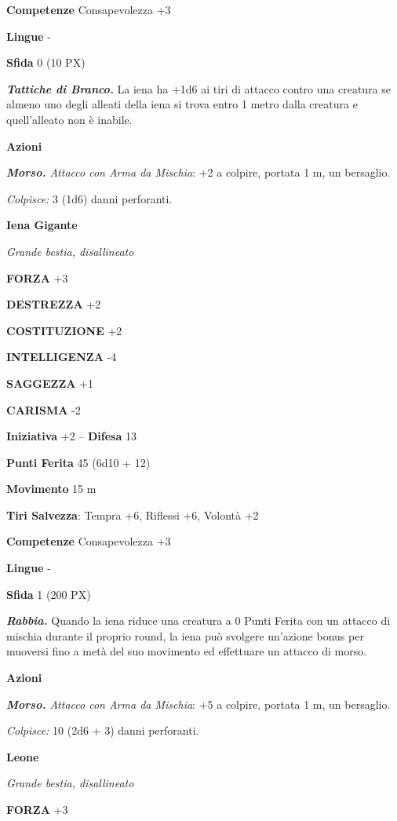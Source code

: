 \begin{multicols}{2}
\textbf{Competenze} Consapevolezza +3

\textbf{Lingue} -

\textbf{Sfida} 0 (10 PX)

\textit{\textbf{Tattiche di Branco.}} La iena ha +1d6 ai tiri di attacco contro una creatura se almeno uno degli alleati della iena si trova entro 1 metro dalla creatura e quell'alleato non è inabile.

\textbf{Azioni}

\textit{\textbf{Morso.} Attacco con Arma da Mischia}: +2 a colpire, portata 1 m, un bersaglio.

\textit{Colpisce:} 3 (1d6) danni perforanti.

\medskip\textbf{Iena Gigante}

\textit{Grande bestia, disallineato}

\textbf{FORZA} +3

\textbf{DESTREZZA} +2

\textbf{COSTITUZIONE} +2

\textbf{INTELLIGENZA} -4

\textbf{SAGGEZZA} +1

\textbf{CARISMA} -2

\textbf{Iniziativa} +2 -- \textbf{Difesa} 13

\textbf{Punti Ferita} 45 (6d10 + 12)

\textbf{Movimento} 15 m

\textbf{Tiri Salvezza}: Tempra +6, Riflessi +6, Volontà +2

\textbf{Competenze} Consapevolezza +3

\textbf{Lingue} -

\textbf{Sfida} 1 (200 PX)

\textit{\textbf{Rabbia.}} Quando la iena riduce una creatura a 0 Punti Ferita con un attacco di mischia durante il proprio round, la iena può svolgere un'azione bonus per muoversi fino a metà del suo movimento ed effettuare un attacco di morso.

\textbf{Azioni}

\textit{\textbf{Morso.} Attacco con Arma da Mischia}: +5 a colpire, portata 1 m, un bersaglio.

\textit{Colpisce:} 10 (2d6 + 3) danni perforanti.

\medskip\textbf{Leone}

\textit{Grande bestia, disallineato}

\textbf{FORZA} +3


\end{multicols}
